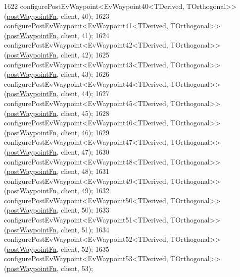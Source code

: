 \begin{DoxyCode}
1622     configurePostEvWaypoint<EvWaypoint40<TDerived, TOrthogonal>>(\hyperlink{classcl__move__base__z_1_1WaypointEventDispatcher_a964a57fcce5d48ec60243230722d8dd7}{postWaypointFn}, client, 40);
1623     configurePostEvWaypoint<EvWaypoint41<TDerived, TOrthogonal>>(\hyperlink{classcl__move__base__z_1_1WaypointEventDispatcher_a964a57fcce5d48ec60243230722d8dd7}{postWaypointFn}, client, 41);
1624     configurePostEvWaypoint<EvWaypoint42<TDerived, TOrthogonal>>(\hyperlink{classcl__move__base__z_1_1WaypointEventDispatcher_a964a57fcce5d48ec60243230722d8dd7}{postWaypointFn}, client, 42);
1625     configurePostEvWaypoint<EvWaypoint43<TDerived, TOrthogonal>>(\hyperlink{classcl__move__base__z_1_1WaypointEventDispatcher_a964a57fcce5d48ec60243230722d8dd7}{postWaypointFn}, client, 43);
1626     configurePostEvWaypoint<EvWaypoint44<TDerived, TOrthogonal>>(\hyperlink{classcl__move__base__z_1_1WaypointEventDispatcher_a964a57fcce5d48ec60243230722d8dd7}{postWaypointFn}, client, 44);
1627     configurePostEvWaypoint<EvWaypoint45<TDerived, TOrthogonal>>(\hyperlink{classcl__move__base__z_1_1WaypointEventDispatcher_a964a57fcce5d48ec60243230722d8dd7}{postWaypointFn}, client, 45);
1628     configurePostEvWaypoint<EvWaypoint46<TDerived, TOrthogonal>>(\hyperlink{classcl__move__base__z_1_1WaypointEventDispatcher_a964a57fcce5d48ec60243230722d8dd7}{postWaypointFn}, client, 46);
1629     configurePostEvWaypoint<EvWaypoint47<TDerived, TOrthogonal>>(\hyperlink{classcl__move__base__z_1_1WaypointEventDispatcher_a964a57fcce5d48ec60243230722d8dd7}{postWaypointFn}, client, 47);
1630     configurePostEvWaypoint<EvWaypoint48<TDerived, TOrthogonal>>(\hyperlink{classcl__move__base__z_1_1WaypointEventDispatcher_a964a57fcce5d48ec60243230722d8dd7}{postWaypointFn}, client, 48);
1631     configurePostEvWaypoint<EvWaypoint49<TDerived, TOrthogonal>>(\hyperlink{classcl__move__base__z_1_1WaypointEventDispatcher_a964a57fcce5d48ec60243230722d8dd7}{postWaypointFn}, client, 49);
1632     configurePostEvWaypoint<EvWaypoint50<TDerived, TOrthogonal>>(\hyperlink{classcl__move__base__z_1_1WaypointEventDispatcher_a964a57fcce5d48ec60243230722d8dd7}{postWaypointFn}, client, 50);
1633     configurePostEvWaypoint<EvWaypoint51<TDerived, TOrthogonal>>(\hyperlink{classcl__move__base__z_1_1WaypointEventDispatcher_a964a57fcce5d48ec60243230722d8dd7}{postWaypointFn}, client, 51);
1634     configurePostEvWaypoint<EvWaypoint52<TDerived, TOrthogonal>>(\hyperlink{classcl__move__base__z_1_1WaypointEventDispatcher_a964a57fcce5d48ec60243230722d8dd7}{postWaypointFn}, client, 52);
1635     configurePostEvWaypoint<EvWaypoint53<TDerived, TOrthogonal>>(\hyperlink{classcl__move__base__z_1_1WaypointEventDispatcher_a964a57fcce5d48ec60243230722d8dd7}{postWaypointFn}, client, 53);

\end{DoxyCode}
